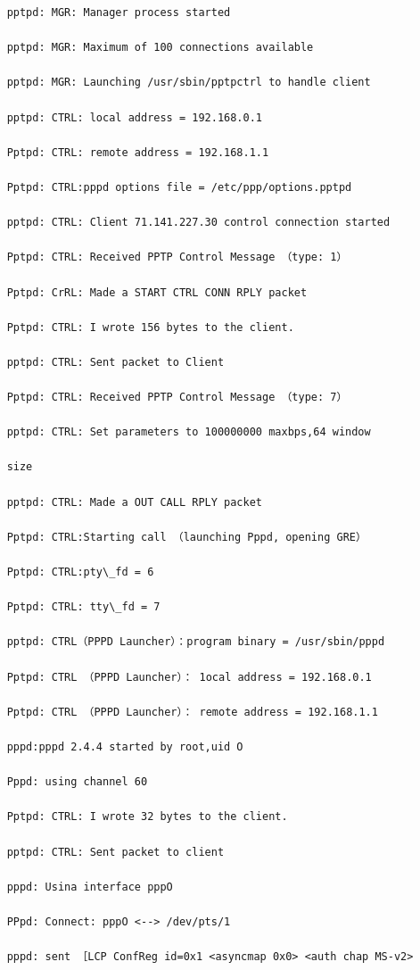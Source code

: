 \begin{verbatim}
    pptpd: MGR: Manager process started
    
    pptpd: MGR: Maximum of 100 connections available
    
    pptpd: MGR: Launching /usr/sbin/pptpctrl to handle client
    
    pptpd: CTRL: local address = 192.168.0.1
    
    Pptpd: CTRL: remote address = 192.168.1.1
    
    Pptpd: CTRL:pppd options file = /etc/ppp/options.pptpd
    
    pptpd: CTRL: Client 71.141.227.30 control connection started
    
    Pptpd: CTRL: Received PPTP Control Message （type: 1）
    
    Pptpd: CrRL: Made a START CTRL CONN RPLY packet
    
    Pptpd: CTRL: I wrote 156 bytes to the client.
    
    pptpd: CTRL: Sent packet to Client
    
    Pptpd: CTRL: Received PPTP Control Message （type: 7）
    
    pptpd: CTRL: Set parameters to 100000000 maxbps,64 window
    
    size
    
    pptpd: CTRL: Made a OUT CALL RPLY packet
    
    Pptpd: CTRL:Starting call （launching Pppd, opening GRE）
    
    Pptpd: CTRL:pty\_fd = 6
    
    Pptpd: CTRL: tty\_fd = 7
    
    pptpd: CTRL（PPPD Launcher）：program binary = /usr/sbin/pppd
    
    Pptpd: CTRL （PPPD Launcher）： 1ocal address = 192.168.0.1
    
    Pptpd: CTRL （PPPD Launcher）： remote address = 192.168.1.1
    
    pppd:pppd 2.4.4 started by root,uid O
    
    Pppd: using channel 60
    
    Pptpd: CTRL: I wrote 32 bytes to the client.
    
    pptpd: CTRL: Sent packet to client
    
    pppd: Usina interface pppO
    
    PPpd: Connect: pppO <--> /dev/pts/1
    
    pppd: sent ［LCP ConfReg id=0x1 <asyncmap 0x0> <auth chap MS-v2>
    

\end{verbatim}
